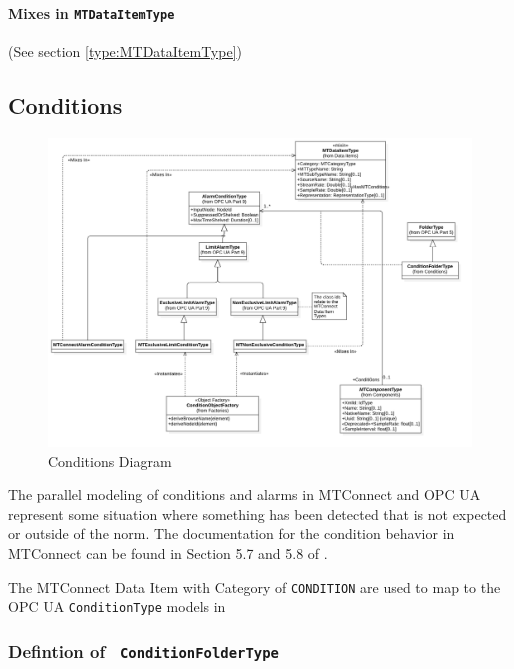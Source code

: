 \paragraph{Mixes in \texttt{MTDataItemType}} (See section \ref{type:MTDataItemType})
\FloatBarrier
\subsection{Conditions} \label{model:Conditions}

\begin{figure}[ht]
  \centering
    \includegraphics[width=1.0\textwidth]{./diagrams/Conditions.png}
  \caption{Conditions Diagram}
  \label{fig:Conditions}
\end{figure}

\FloatBarrier


The parallel modeling of conditions and alarms in MTConnect and OPC UA represent some
situation where something has been detected that is not expected or outside of the norm. The
documentation for the condition behavior in MTConnect can be found in Section 5.7 and 
5.8 of \cite{MTCPart3}.

The MTConnect Data Item with Category of \texttt{CONDITION} are used to map to the 
OPC UA \texttt{ConditionType} models in \cite{UAPart9}

\subsubsection{Defintion of \texttt{ ConditionFolderType}} \label{type:ConditionFolderType}

\FloatBarrier


